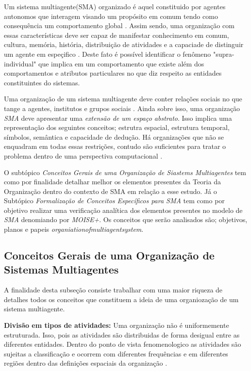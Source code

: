Um sistema multiagente(SMA) organizado é aquel constituido por agentes autonomos que interagem visando um propósito em comum tendo como consequência um comportamento global \cite{moiseframework} 
\cite{organiationofmultiagentsystem}. Assim sendo, uma organização com essas características deve ser capaz de manifestar conhecimento em comum, cultura, memória, história, distribuição de atividades 
e a capaciade de distinguir um  agente em espeçifico \cite{organiationofmultiagentsystem}. Deste fato é possível identificar o fenômeno "supra-individual" que implica em um comportamento que existe
além dos comportamentos e atributos particulares no que diz respeito as entidades constituintes do sistemas. 

Uma organização de um sistema multiagente deve conter relações sociais no que tange a agentes, institutos e grupos sociais \cite{organiationofmultiagentsystem}. Ainda sobre isso, uma organização 
\textit{SMA} deve apresentar uma \textit{extensão de um espaço abstrato}. Isso implica uma representação dos seguintes conceitos; estrutra espacial, estrutura temporal, símbolos, semântica e 
capacidade de dedução. Há organizações que não se enquadram em todas essas restrições, contudo são suficientes para tratar o problema dentro de uma perspectiva computacional \cite{organiationofmultiagentsystem}.

O subtópico \textit{Conceitos Gerais de uma Organização de Siastems Multiagentes} tem como por finalidade detalhar melhor os elementos presentes da Teoria da Organização dentro do contexto de SMA
em relação a esse estudo. Já o Subtópico \textit{Formalização de Conceitos Específicos para SMA} tem como por objetivo realizar uma verificação analítica dos elementos presentes no modelo de \textit{SMA} 
denomiando por \textit{MOISE+}. Os conceitos que serão analisados são; objetivos, planos e papeis \textit{organiationofmultiagentsystem}.
   

\subsection{Conceitos Gerais de uma Organização de Sistemas Multiagentes}

A finalidade desta subseção consiste trabalhar com uma maior riqueza de detalhes todos os conceitos que constituem a ideia de uma organiozação de um sistema multiagente.  
  
\textbf{Divisão em tipos de atividades:} Uma organização não é uniformemente estruturada. Isso, pois as atividades são distribuidas de forma desigual entre as diferentes entidades.
Dentro do ponto de vista fenomenologico as atividades são sujeitas a classificação e ocorrem com diferentes frequências e em diferentes regiões dentro das definições espaciais da organização \cite{organiationofmultiagentsystem}.

